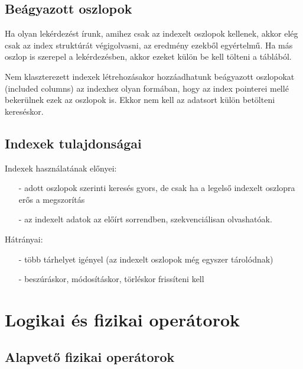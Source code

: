 \documentclass[12pt]{article}
\theoremstyle{plain}
\begin{document}
\subsection{Beágyazott oszlopok}

Ha olyan lekérdezést írunk, amihez csak az indexelt oszlopok kellenek, akkor elég csak az index struktúrát végigolvasni, az eredmény ezekből egyértelmű. Ha más oszlop is szerepel a lekérdezésben, akkor ezeket külön be kell tölteni a táblából.\par
Nem klaszterezett indexek létrehozásakor hozzáadhatunk beágyazott oszlopokat (included columns) az indexhez olyan formában, hogy az index pointerei mellé bekerülnek ezek az oszlopok is. Ekkor nem kell az adatsort külön betölteni kereséskor.

\subsection{Indexek tulajdonságai}

Indexek használatának előnyei:
\begin{itemize}
    \item[-]adott oszlopok szerinti keresés gyors, de csak ha a legelső indexelt oszlopra erős a megszorítás
    \item[-]az indexelt adatok az előírt sorrendben, szekvenciálisan olvashatóak.
\end{itemize}{}
Hátrányai:
\begin{itemize}
    \item[-]több tárhelyet igényel (az indexelt oszlopok még egyszer tárolódnak)
    \item[-]beszúráskor, módosításkor, törléskor frissíteni kell
\end{itemize}{}


\section{Logikai és fizikai operátorok}

\subsection{Alapvető fizikai operátorok}
\end{document}
